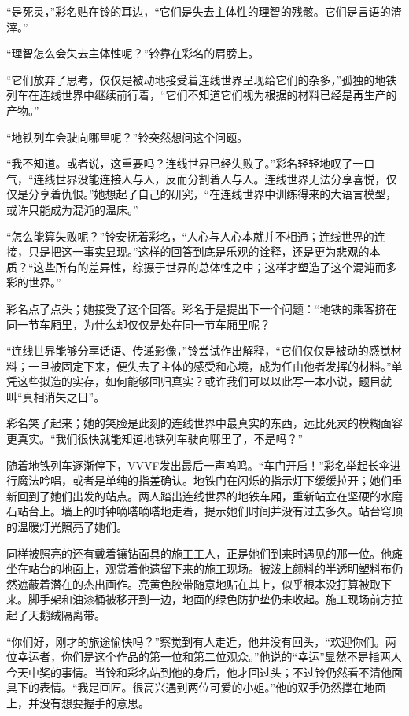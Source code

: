 “是死灵，”彩名贴在铃的耳边，“它们是失去主体性的理智的残骸。它们是言语的渣滓。”

“理智怎么会失去主体性呢？”铃靠在彩名的肩膀上。

“它们放弃了思考，仅仅是被动地接受着连线世界呈现给它们的杂多，”孤独的地铁列车在连线世界中继续前行着，“它们不知道它们视为根据的材料已经是再生产的产物。”

“地铁列车会驶向哪里呢？”铃突然想问这个问题。

“我不知道。或者说，这重要吗？连线世界已经失败了。”彩名轻轻地叹了一口气，“连线世界没能连接人与人，反而分割着人与人。连线世界无法分享喜悦，仅仅是分享着仇恨。”她想起了自己的研究，“在连线世界中训练得来的大语言模型，或许只能成为混沌的温床。”

“怎么能算失败呢？”铃安抚着彩名，“人心与人心本就并不相通；连线世界的连接，只是把这一事实显现。”这样的回答到底是乐观的诠释，还是更为悲观的本质？“这些所有的差异性，综摄于世界的总体性之中；这样才塑造了这个混沌而多彩的世界。”

彩名点了点头；她接受了这个回答。彩名于是提出下一个问题：“地铁的乘客挤在同一节车厢里，为什么却仅仅是处在同一节车厢里呢？

“连线世界能够分享话语、传递影像，”铃尝试作出解释，“它们仅仅是被动的感觉材料；一旦被固定下来，便失去了主体的感受和心境，成为任由他者发挥的材料。”单凭这些拟造的实存，如何能够回归真实？或许我们可以以此写一本小说，题目就叫“真相消失之日”。

彩名笑了起来；她的笑脸是此刻的连线世界中最真实的东西，远比死灵的模糊面容更真实。“我们很快就能知道地铁列车驶向哪里了，不是吗？”

随着地铁列车逐渐停下，VVVF发出最后一声呜鸣。“车门开启！”彩名举起长伞进行魔法吟唱，或者是单纯的指差确认。地铁门在闪烁的指示灯下缓缓拉开；她们重新回到了她们出发的站点。两人踏出连线世界的地铁车厢，重新站立在坚硬的水磨石站台上。墙上的时钟嘀嗒嘀嗒地走着，提示她们时间并没有过去多久。站台穹顶的温暖灯光照亮了她们。

同样被照亮的还有戴着镶钻面具的施工工人，正是她们到来时遇见的那一位。他瘫坐在站台的地面上，观赏着他遗留下来的施工现场。被泼上颜料的半透明塑料布仍然遮蔽着潜在的杰出画作。亮黄色胶带随意地贴在其上，似乎根本没打算被取下来。脚手架和油漆桶被移开到一边，地面的绿色防护垫仍未收起。施工现场前方拉起了天鹅绒隔离带。

“你们好，刚才的旅途愉快吗？”察觉到有人走近，他并没有回头，“欢迎你们。两位幸运者，你们是这个作品的第一位和第二位观众。”他说的“幸运”显然不是指两人今天中奖的事情。当铃和彩名站到他的身后，他才回过头；不过铃仍然看不清他面具下的表情。“我是画匠。很高兴遇到两位可爱的小姐。”他的双手仍然撑在地面上，并没有想要握手的意思。

